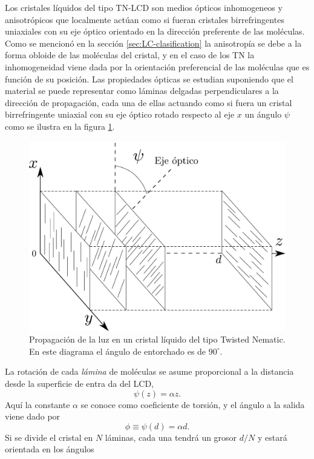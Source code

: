 Los cristales líquidos del tipo TN-LCD son medios ópticos inhomogeneos
y anisotrópicos que localmente actúan como si fueran cristales
birrefringentes uniaxiales con su eje óptico orientado en la dirección
preferente de las moléculas. Como se mencionó en la sección
\ref{sec:LC-clasification} la anisotropía se debe a la forma obloide
de las moléculas del cristal, y en el caso de los TN la inhomogeneidad
viene dada por la orientación preferencial de las moléculas que es
función de su posición. Las propiedades ópticas se estudian suponiendo
que el material se puede representar como láminas delgadas perpendiculares a la
dirección de propagación, cada una de ellas actuando como si fuera un
cristal birrefringente uniaxial con su eje óptico rotado respecto al eje $x$ un ángulo
$\psi$ como se ilustra en la figura
\ref{fig:tn-lcd_sticks}.  
\begin{figure}[h!]
\centering
\includegraphics[scale = .3]{TN-LCD_sticks}
\caption[Propagación de la luz en un TN-LC]{Propagación de la luz en
  un cristal líquido del tipo Twisted 
  Nematic. En este diagrama el ángulo de entorchado es de $90^{\circ}$.}
\label{fig:tn-lcd_sticks}
\end{figure}
La rotación de cada \textit{lámina} de
moléculas se asume proporcional a la distancia desde la superficie de
entra da del LCD,
\begin{equation}
  \label{eq:twist_angle}
\psi(z)  =\alpha z.  
\end{equation}
Aquí la constante $\alpha$
se conoce como coeficiente de torsión, y el ángulo a la salida viene
dado por $$\phi \equiv \psi(d)=\alpha d.$$ Si se divide el cristal en
$N$ láminas, cada una tendrá un grosor $d/N$ y estará orientada en los ángulos
